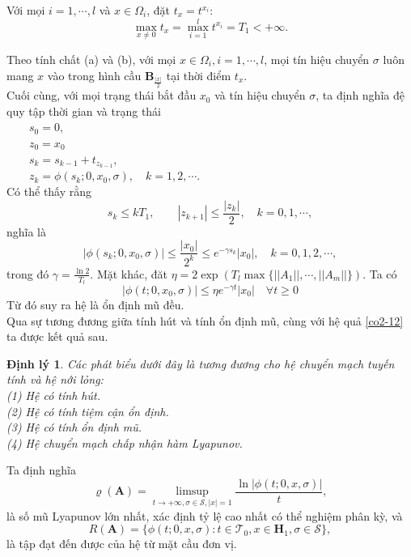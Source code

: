 \documentclass[14pt,a4paper,oneside]{report}		%
\newtheorem{theorem}{Định lý}[chapter]\theoremstyle{definition}
\begin{document}
Với mọi $i=1,\cdots,l$ và $x\in\Omega_i$, đặt $t_x = t^{x_i}$:
\begin{equation} \label{eq2-25}
\max_{x\neq 0}t_x = \max_{i=1}^lt^{x_i}=T_1 <+\infty.
\end{equation}

Theo tính chất (a) và (b), với mọi $x\in\Omega_i, i=1,\cdots,l$, mọi tín hiệu chuyển $\sigma$ luôn mang $x$ vào trong hình cầu $\mathbf{B}_{\frac{|x|}{2}}$ tại thời điểm $t_x$.\\

Cuối cùng, với mọi trạng thái bắt đầu $x_0$ và tín hiệu chuyển $\sigma$, ta định nghĩa đệ quy tập thời gian và trạng thái\\
$\qquad s_0=0,$\\
$\qquad z_0=x_0$\\
$\qquad s_k=s_{k-1}+t_{z_{k-1}},$\\
$\qquad z_k = \phi (s_k;0,x_0,\sigma),\quad k=1,2,\cdots.$\\
Có thể thấy rằng
\begin{equation} \label{eq2-26}
s_k \leq kT_1,\qquad |z_{k+1}|\leq \frac{|z_k|}{2}, \quad k=0,1,\cdots,
\end{equation}
nghĩa là 
$$|\phi(s_k;0,x_0,\sigma)|\leq\frac{|x_0|}{2^k}\leq e^{-\gamma s_k}|x_0|,\quad k=0,1,2,\cdots,$$
trong đó $\gamma = \frac{\ln 2}{T_l}$. Mặt khác, đăt $\eta = 2\exp(T_l\max\{||A_1||,\cdots,||A_m||\})$. Ta có
\begin{equation} \label{eq2-27}
|\phi (t;0,x_0,\sigma)|\leq \eta e^{-\gamma t}|x_0|\quad \forall t\geq 0
\end{equation}
Từ đó suy ra hệ là ổn định mũ đều.\\

Qua sự tương đương giữa tính hút và tính ổn định mũ, cùng với hệ quả \ref{co2-12} ta được kết quả sau.

\begin{theorem}\label{the2-15}
Các phát biểu dưới đây là tương đương cho hệ chuyển mạch tuyến tính và hệ nới lỏng:\\
(1) Hệ có tính hút.\\
(2) Hệ có tính tiệm cận ổn định.\\
(3) Hệ có tính ổn định mũ.\\
(4) Hệ chuyển mạch chấp nhận hàm Lyapunov.
\end{theorem}
Ta định nghĩa
\begin{equation}\label{eq2-28}
\varrho (\mathbf{A})=\limsup_{t\rightarrow +\infty,\sigma\in\mathcal{S},|x|=1}\frac{\ln|\phi(t;0,x,\sigma)|}{t},
\end{equation}
là số mũ Lyapunov lớn nhất, xác định tỷ lệ cao nhất có thể nghiệm phân kỳ, và
\begin{equation}\label{eq2-29}
R(\mathbf{A})=\{\phi (t;0,x,\sigma):t\in\mathcal{T}_0,x\in\mathbf{H}_1,\sigma\in\mathcal{S}\},
\end{equation}
là tập đạt đến được của hệ từ mặt cầu đơn vị.
\end{document}
